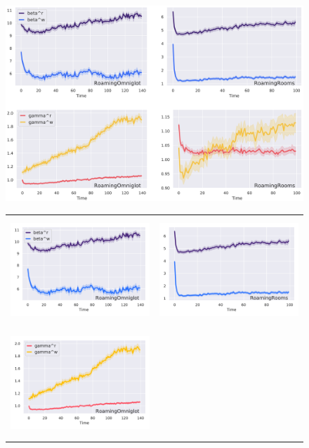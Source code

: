 \begin{figure}
\centering
\iflatexml
\includegraphics[width=6\linewidth]{figures/beta-gamma.png}
\else
\begin{tabular}{cc}
\includegraphics[height=4.0cm,trim={0.3cm 0cm 0.5cm 0},clip]{figures/omniglot-beta.pdf}
\quad
&
\includegraphics[height=4.0cm,trim={0.3cm 0cm 0cm 0},clip]{figures/matterport-beta.pdf}
\\
\includegraphics[height=4.0cm,trim={0.3cm 0cm 0.5cm 0},clip]{figures/omniglot-gamma.pdf}

\end{tabular}
\end{figure}
